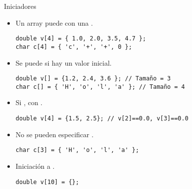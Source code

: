 \begin{frame}[t,fragile]{Iniciadores}
\begin{itemize}
  \item Un array puede  con una .
\begin{lstlisting}
double v[4] = { 1.0, 2.0, 3.5, 4.7 };
char c[4] = { 'c', '+', '+', 0 };
\end{lstlisting}

  \item Se puede  si hay un valor inicial.
\begin{lstlisting}
double v[] = {1.2, 2.4, 3.6 }; // Tamaño = 3
char c[] = { 'H', 'o', 'l', 'a' }; // Tamaño = 4
\end{lstlisting}

  \item Si ,  con .
\begin{lstlisting}
double v[4] = {1.5, 2.5}; // v[2]==0.0, v[3]==0.0
\end{lstlisting}

  \item No se pueden especificar .
\begin{lstlisting}
char c[3] = { 'H', 'o', 'l', 'a' };
\end{lstlisting}

  \item Iniciación a .
\begin{lstlisting}
double v[10] = {};
\end{lstlisting}
\end{itemize}
\end{frame}

